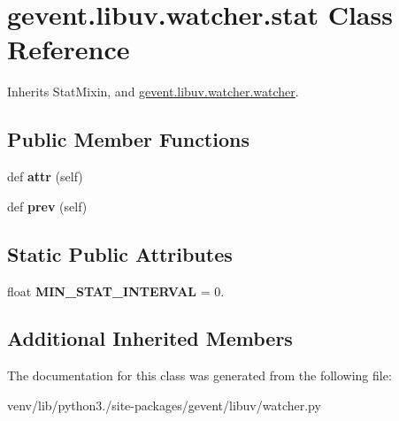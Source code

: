 \hypertarget{classgevent_1_1libuv_1_1watcher_1_1stat}{}\section{gevent.\+libuv.\+watcher.\+stat Class Reference}
\label{classgevent_1_1libuv_1_1watcher_1_1stat}


Inherits Stat\+Mixin, and \hyperlink{classgevent_1_1libuv_1_1watcher_1_1watcher}{gevent.\+libuv.\+watcher.\+watcher}.

\subsection*{Public Member Functions}
\begin{DoxyCompactItemize}
\item 
\mbox{\label{classgevent_1_1libuv_1_1watcher_1_1stat_a1280ba7b60a1adb4236cf27e62a03814}} 
def {\bfseries attr} (self)
\item 
\mbox{\label{classgevent_1_1libuv_1_1watcher_1_1stat_a46897914079b81c395af834fd72be692}} 
def {\bfseries prev} (self)
\end{DoxyCompactItemize}
\subsection*{Static Public Attributes}
\begin{DoxyCompactItemize}
\item 
\mbox{\label{classgevent_1_1libuv_1_1watcher_1_1stat_abf4defc9881ac4d98251a417393cda6f}} 
float {\bfseries M\+I\+N\+\_\+\+S\+T\+A\+T\+\_\+\+I\+N\+T\+E\+R\+V\+AL} = 0.
\end{DoxyCompactItemize}
\subsection*{Additional Inherited Members}


The documentation for this class was generated from the following file\+:\begin{DoxyCompactItemize}
\item 
venv/lib/python3./site-\/packages/gevent/libuv/watcher.\+py\end{DoxyCompactItemize}
